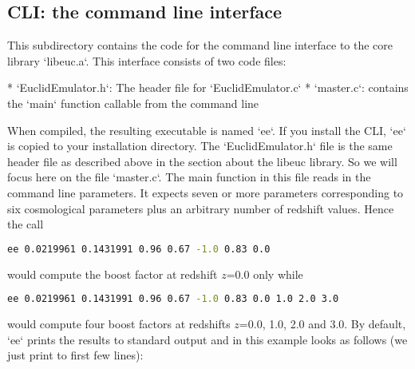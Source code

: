 \documentclass[american,11pt]{article}
\begin{document}
\subsection{CLI: the command line interface}
This subdirectory contains the code for the command line interface to the core library `libeuc.a`. This interface consists of two code files:

* `EuclidEmulator.h`: The header file for `EuclidEmulator.c`
* `master.c`: contains the `main` function callable from the command line

When compiled, the resulting executable is named `ee`. If you install the CLI, `ee` is copied to your installation directory.
The `EuclidEmulator.h` file is the same header file as described above in the section about the libeuc library. So we will focus here on the file `master.c`. The main function in this file reads in the command line parameters. It expects seven or more parameters corresponding to six cosmological parameters plus an arbitrary number of redshift values. Hence the call

\begin{lstlisting}[language=bash]
   ee 0.0219961 0.1431991 0.96 0.67 -1.0 0.83 0.0
\end{lstlisting}

would compute the boost factor at redshift $z$=0.0 only while 
\begin{lstlisting}[language=bash]
   ee 0.0219961 0.1431991 0.96 0.67 -1.0 0.83 0.0 1.0 2.0 3.0
\end{lstlisting}
would compute four boost factors at redshifts $z$=0.0, 1.0, 2.0 and 3.0. By default, `ee` prints the results to standard output and in this example looks as follows (we just print to first few lines):
\end{document}
